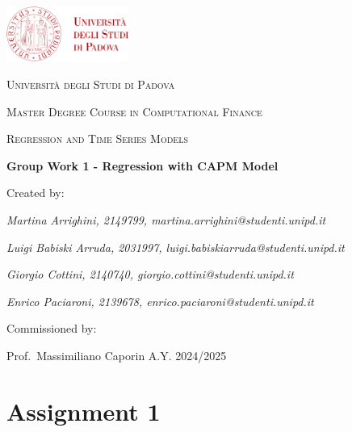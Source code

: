 \documentclass[12pt, openright, twoside]{report}
\begin{document}

    \begin{titlepage}
        \centering
        \includegraphics[width=0.3\textwidth]{images/logo_unipd.png}\par\vspace{1cm}
        {\scshape\LARGE Università degli Studi di Padova \par}
        \vspace{1.5cm}
        {\scshape\Large Master Degree Course in Computational Finance \par}
        \vspace{.2cm}
        {\scshape\large Regression and Time Series Models \par}
        \vspace{2cm}
        {\Large\bfseries Group Work 1 - Regression with CAPM Model\par}
        \vspace{2cm}
        Created by:\par
        {\itshape{Martina Arrighini, 2149799, martina.arrighini@studenti.unipd.it}\par}
        {\itshape Luigi Babiski Arruda, 2031997, luigi.babiskiarruda@studenti.unipd.it\par}
        {\itshape Giorgio Cottini, 2140740, giorgio.cottini@studenti.unipd.it \par}
        {\itshape Enrico Paciaroni, 2139678, enrico.paciaroni@studenti.unipd.it \par}
        \vfill
        Commissioned by:\par
        Prof.\ Massimiliano Caporin
        \vfill
        {\large A.Y. 2024/2025}
    \end{titlepage}

\setcounter{page}{1}

\section*{Assignment 1}

\end{document}
